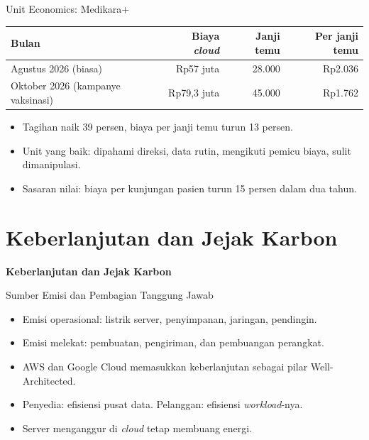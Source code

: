 \documentclass[aspectratio=169, table, 12pt]{beamer}
\begin{document}
\begin{frame}{{\Large Unit Economics: Medikara+}}
  \vspace{6pt}
  \footnotesize
  \begin{tabularx}{\textwidth}{>{\raggedright\arraybackslash}X r r r}
    \hline
    \textbf{Bulan} & \textbf{Biaya \textit{cloud}} & \textbf{Janji temu}
      & \textbf{Per janji temu} \\
    \hline
    Agustus 2026 (biasa) & Rp57 juta & 28.000 & Rp2.036 \\
    \hline
    Oktober 2026 (kampanye vaksinasi) & Rp79,3 juta & 45.000 & Rp1.762 \\
    \hline
  \end{tabularx}

  \vspace{10pt}
  \small
  \begin{itemize}
    \item Tagihan naik 39 persen, biaya per janji temu turun 13 persen.
    \item Unit yang baik: dipahami direksi, data rutin, mengikuti pemicu biaya,
          sulit dimanipulasi.
    \item Sasaran nilai: biaya per kunjungan pasien turun 15 persen dalam dua
          tahun.
  \end{itemize}
\end{frame}

\section{Keberlanjutan dan Jejak Karbon}

\begin{frame}{\hfill}
  \centering
  \Huge{\textbf{Keberlanjutan dan Jejak Karbon}}
\end{frame}

\begin{frame}{{\Large Sumber Emisi dan Pembagian Tanggung Jawab}}
  \vspace{10pt}
  \begin{itemize}
    \item Emisi operasional: listrik server, penyimpanan, jaringan, pendingin.
    \item Emisi melekat: pembuatan, pengiriman, dan pembuangan perangkat.
    \item AWS dan Google Cloud memasukkan keberlanjutan sebagai pilar
          Well-Architected.
    \item Penyedia: efisiensi pusat data. Pelanggan: efisiensi
          \textit{workload}-nya.
    \item Server menganggur di \textit{cloud} tetap membuang energi.
  \end{itemize}
\end{frame}
\end{document}
